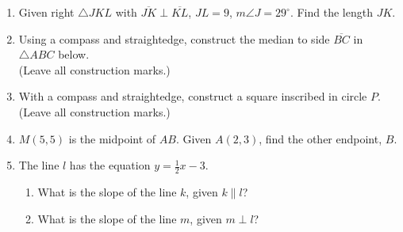 \documentclass[12pt, twoside]{article}
\begin{document}
\begin{enumerate}
      \item Given right $\triangle JKL$ with $\overline{JK} \perp \overline{KL}$, $JL=9$, $m\angle J=29^\circ$. Find the length $JK$.

\newpage

    \item Using  a  compass  and  straightedge,  construct  the  median  to  side $\overline{BC}$ in $\triangle ABC$ below.\\ (Leave all construction marks.)
      \vspace{1cm}
    \begin{center}
    \end{center}

      \vspace{2cm}

    \item With a compass and straightedge, construct a square inscribed in circle $P$. (Leave all construction marks.)
      \vspace{1cm}
      \begin{center}
      \end{center}

\newpage

    \item $M(5,5)$ is the midpoint of $AB$. Given $A(2,3)$, find the other endpoint, $B$. \vspace{2cm}

    \item The line $l$ has the equation $y=\frac{1}{2} x-3$.
      \begin{enumerate}
        \item What is the slope of the line $k$, given $k \parallel l$?
        \vspace{1cm}
        \item What is the slope of the line $m$, given $m \perp l$?
        \vspace{1cm}
      \end{enumerate}


\end{enumerate}
\end{document}
